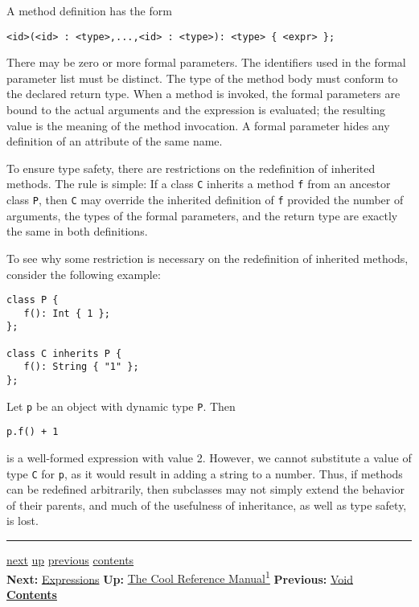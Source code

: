 \documentclass[]{article}
\begin{document}
A method definition has the form

\begin{verbatim}
<id>(<id> : <type>,...,<id> : <type>): <type> { <expr> };
\end{verbatim}

There may be zero or more formal parameters. The identifiers used in the
formal parameter list must be distinct. The type of the method body must
conform to the declared return type. When a method is invoked, the
formal parameters are bound to the actual arguments and the expression
is evaluated; the resulting value is the meaning of the method
invocation. A formal parameter hides any definition of an attribute of
the same name.

To ensure type safety, there are restrictions on the redefinition of
inherited methods. The rule is simple: If a class \texttt{C} inherits a
method \texttt{f} from an ancestor class \texttt{P}, then \texttt{C} may
override the inherited definition of \texttt{f} provided the number of
arguments, the types of the formal parameters, and the return type are
exactly the same in both definitions.

To see why some restriction is necessary on the redefinition of
inherited methods, consider the following example:

\begin{verbatim}
class P {
   f(): Int { 1 };
};

class C inherits P {
   f(): String { "1" };
};
\end{verbatim}

Let \texttt{p} be an object with dynamic type \texttt{P}. Then

\begin{verbatim}
p.f() + 1
\end{verbatim}

is a well-formed expression with value 2. However, we cannot substitute
a value of type \texttt{C} for \texttt{p}, as it would result in adding
a string to a number. Thus, if methods can be redefined arbitrarily,
then subclasses may not simply extend the behavior of their parents, and
much of the usefulness of inheritance, as well as type safety, is lost.

\begin{center}\rule{3in}{0.4pt}\end{center}

\href{node13.html}{next} \href{cool-manual.html}{up}
\href{node11.html}{previous} \href{node1.html}{contents} \\
\textbf{Next:} \href{node13.html}{Expressions} \textbf{Up:}
\href{cool-manual.html}{The Cool Reference Manual\textsuperscript{1}}
\textbf{Previous:} \href{node11.html}{Void} ~
\textbf{\href{node1.html}{Contents}}
\end{document}
